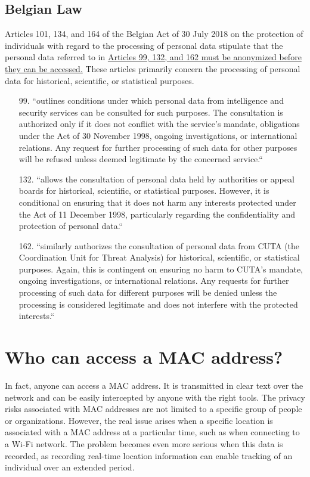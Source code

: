 \documentclass[aps,prb,twocolumn,superscriptaddress,floatfix,longbibliography,nofootinbib]{revtex4-2}
\begin{document}
  \subsection{\label{subsec:BEL}Belgian Law}

  Articles 101, 134, and 164 of the Belgian Act of 30 July 2018 on the protection
  of individuals with regard to the processing of personal data
  stipulate that the personal data referred to in
  \ul{Articles 99, 132, and 162 must be anonymized before they can be accessed.} 
  These articles primarily concern the processing of personal data for historical, 
  scientific, or statistical purposes.

    \begin{enumerate}
    \item[99.] ``outlines conditions under which personal data from intelligence 
    and security services can be consulted for such purposes. The consultation 
    is authorized only if it does not conflict with the service’s mandate, obligations 
    under the Act of 30 November 1998, ongoing investigations, or international relations. 
    Any request for further processing of such data for other purposes will be refused 
    unless deemed legitimate by the concerned service.``

    \item[132.] ``allows the consultation of personal data held by authorities or 
    appeal boards for historical, scientific, or statistical purposes. However, 
    it is conditional on ensuring that it does not harm any interests protected 
    under the Act of 11 December 1998, particularly regarding the confidentiality 
    and protection of personal data.``

    \item[162.] ``similarly authorizes the consultation of personal data from CUTA 
    (the Coordination Unit for Threat Analysis) for historical, scientific, or 
    statistical purposes. Again, this is contingent on ensuring no harm to CUTA’s 
    mandate, ongoing investigations, or international relations. Any requests for 
    further processing of such data for different purposes will be denied unless 
    the processing is considered legitimate and does not interfere with the 
    protected interests.``
    \end{enumerate}
  \cite{BelgianAct2018}

\section{\label{sec:Who}Who can access a MAC address?}
  In fact, anyone can access a MAC address. It is transmitted in clear text over 
  the network and can be easily intercepted by anyone with the right tools. The privacy risks associated
  with MAC addresses are not limited to a specific group of people or organizations.
  However, the real issue arises when a specific location is associated with a 
  MAC address at a particular time, such as when connecting to a Wi-Fi network. 
  The problem becomes even more serious when this data is recorded, as recording 
  real-time location information can enable tracking of an individual over an 
  extended period.
\end{document}
